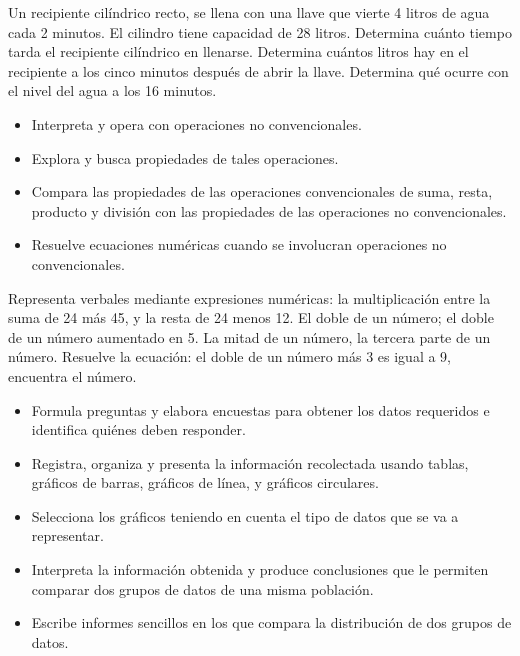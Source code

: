 \ejemplo


Un recipiente cilíndrico recto, se llena con una llave que vierte 4 litros de agua cada 2 minutos. El cilindro tiene capacidad de 28 litros. Determina cuánto tiempo tarda el recipiente cilíndrico en llenarse. Determina cuántos litros hay en el recipiente a los cinco minutos después de abrir la llave. Determina qué ocurre con el nivel del agua a los 16 minutos.



\evidencias

\begin{itemize}
  \item Interpreta y opera con operaciones no convencionales.
  \item Explora y busca propiedades de tales operaciones.
  \item Compara las propiedades de las operaciones convencionales de suma, resta, producto y división con las propiedades de las operaciones no convencionales.
  \item Resuelve ecuaciones numéricas cuando se involucran operaciones no convencionales.
\end{itemize}

\ejemplo

Representa verbales mediante expresiones numéricas: la multiplicación entre la suma de 24 más 45, y la resta de 24 menos 12. El doble de un número; el doble de un número aumentado en 5. La mitad de un número, la tercera parte de un número. Resuelve la ecuación: el doble de un número más 3 es igual a 9, encuentra el número.



\evidencias

\begin{itemize}
  \item Formula preguntas y elabora encuestas para obtener los datos requeridos e identifica quiénes deben responder.
  \item Registra, organiza y presenta la información recolectada usando tablas, gráficos de barras, gráficos de línea, y gráficos circulares.
  \item Selecciona los gráficos teniendo en cuenta el tipo de datos que se va a representar.
  \item Interpreta la información obtenida y produce conclusiones que le permiten comparar dos grupos de datos de una misma población.
  \item Escribe informes sencillos en los que compara la distribución de dos grupos de datos.
\end{itemize}

